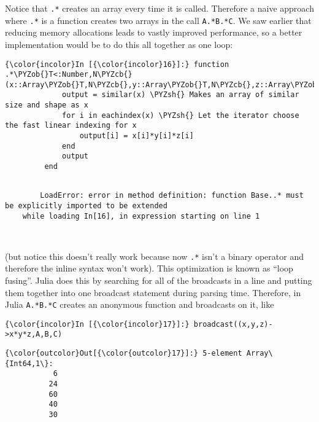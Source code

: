 \documentclass[11pt]{article}
\def\PYZob{\char`\{}
\def\PYZcb{\char`\}}
\def\PYZsh{\char`\#}
\begin{document}
    Notice that \texttt{.*} creates an array every time it is called.
Therefore a naive approach where \texttt{.*} is a function creates two
arrays in the call \texttt{A.*B.*C}. We saw earlier that reducing memory
allocations leads to vastly improved performance, so a better
implementation would be to do this all together as one loop:

    \begin{Verbatim}[commandchars=\\\{\}]
{\color{incolor}In [{\color{incolor}16}]:} function .*\PYZob{}T<:Number,N\PYZcb{}(x::Array\PYZob{}T,N\PYZcb{},y::Array\PYZob{}T,N\PYZcb{},z::Array\PYZob{}T,N\PYZcb{})
             output = similar(x) \PYZsh{} Makes an array of similar size and shape as x
             for i in eachindex(x) \PYZsh{} Let the iterator choose the fast linear indexing for x
                 output[i] = x[i]*y[i]*z[i]
             end
             output
         end
\end{Verbatim}

    \begin{Verbatim}[commandchars=\\\{\}]

        LoadError: error in method definition: function Base..* must be explicitly imported to be extended
    while loading In[16], in expression starting on line 1

        

    \end{Verbatim}

    (but notice this doesn't really work because now \texttt{.*} isn't a
binary operator and therefore the inline syntax won't work). This
optimization is known as ``loop fusing''. Julia does this by searching
for all of the broadcasts in a line and putting them together into one
broadcast statement during parsing time. Therefore, in Julia
\texttt{A.*B.*C} creates an anonymous function and broadcasts on it,
like

    \begin{Verbatim}[commandchars=\\\{\}]
{\color{incolor}In [{\color{incolor}17}]:} broadcast((x,y,z)->x*y*z,A,B,C)
\end{Verbatim}

            \begin{Verbatim}[commandchars=\\\{\}]
{\color{outcolor}Out[{\color{outcolor}17}]:} 5-element Array\{Int64,1\}:
           6
          24
          60
          40
          30
\end{Verbatim}
        
\end{document}
